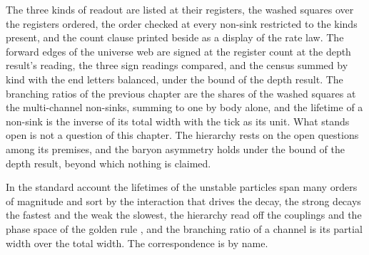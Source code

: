 The three kinds of readout are listed at their registers, the washed squares over the registers ordered, the order checked at every non-sink restricted to the kinds present, and the count clause printed beside as a display of the rate law. The forward edges of the universe web are signed at the register count at the depth result's reading, the three sign readings compared, and the census summed by kind with the end letters balanced, under the bound of the depth result. The branching ratios of the previous chapter are the shares of the washed squares at the multi-channel non-sinks, summing to one by body alone, and the lifetime of a non-sink is the inverse of its total width with the tick as its unit. What stands open is not a question of this chapter. The hierarchy rests on the open questions among its premises, and the baryon asymmetry holds under the bound of the depth result, beyond which nothing is claimed.
\begin{chbridge}
In the standard account the lifetimes of the unstable particles span many orders of magnitude and sort by the interaction that drives the decay, the strong decays the fastest and the weak the slowest, the hierarchy read off the couplings and the phase space of the golden rule \cite{Fermi1934,WeisskopfWigner1930}, and the branching ratio of a channel is its partial width over the total width. The correspondence is by name.
\end{chbridge}
